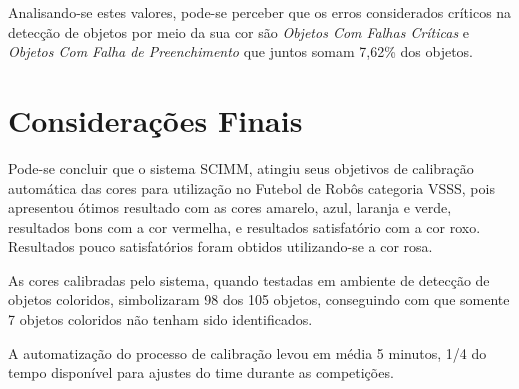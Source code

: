 	
	Analisando-se estes valores, pode-se perceber que os erros considerados críticos na detecção de objetos por meio da sua cor são \textit{Objetos Com Falhas Críticas} e \textit{Objetos Com Falha de Preenchimento} que juntos somam 7,62\% dos objetos.
	
	\section{Considerações Finais}
	
	Pode-se concluir que o sistema SCIMM, atingiu seus objetivos de calibração automática das cores para utilização no Futebol de Robôs categoria VSSS, pois apresentou ótimos resultado com as cores amarelo, azul, laranja e verde, resultados bons com a cor vermelha, e resultados satisfatório com a cor roxo. Resultados pouco satisfatórios foram obtidos utilizando-se a cor rosa. 
	
	As cores calibradas pelo sistema, quando testadas em ambiente de detecção de objetos coloridos, simbolizaram 98 dos 105 objetos, conseguindo com que somente 7 objetos coloridos não tenham sido identificados.
	
	A automatização do processo de calibração levou em média 5 minutos, 1/4 do tempo disponível para ajustes do time durante as competições.